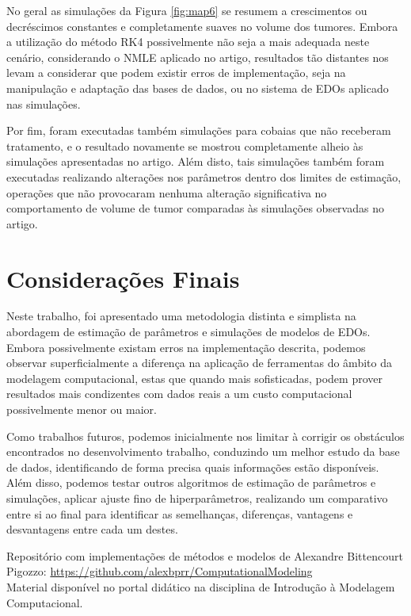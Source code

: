 \documentclass[12pt]{article}
\begin{document}
No geral as simulações da Figura \ref{fig:map6} se resumem a crescimentos ou decréscimos constantes e completamente suaves no volume dos tumores. Embora a utilização do método RK4 possivelmente não seja a mais adequada neste cenário, considerando o NMLE aplicado no artigo, resultados tão distantes nos levam a considerar que podem existir erros de implementação, seja na manipulação e adaptação das bases de dados, ou no sistema de EDOs aplicado nas simulações.

Por fim, foram executadas também simulações para cobaias que não receberam tratamento, e o resultado novamente se mostrou completamente alheio às simulações apresentadas no artigo. Além disto, tais simulações também foram executadas realizando alterações nos parâmetros dentro dos limites de estimação, operações que não provocaram nenhuma alteração significativa no comportamento de volume de tumor comparadas às simulações observadas no artigo. 

\section{Considerações Finais} \label{sec:5}

Neste trabalho, foi apresentado uma metodologia distinta e simplista na abordagem de estimação de parâmetros e simulações de modelos de EDOs. Embora possivelmente existam erros na implementação descrita, podemos observar superficialmente a diferença na aplicação de ferramentas do âmbito da modelagem computacional, estas que quando mais sofisticadas, podem prover resultados mais condizentes com dados reais a um custo computacional possivelmente menor ou maior.

Como trabalhos futuros, podemos inicialmente nos limitar à corrigir os obstáculos encontrados no desenvolvimento trabalho, conduzindo um melhor estudo da base de dados, identificando de forma precisa quais informações estão disponíveis. Além disso, podemos testar outros algoritmos de estimação de parâmetros e simulações, aplicar ajuste fino de hiperparâmetros, realizando um comparativo entre si ao final para identificar as semelhanças, diferenças, vantagens e desvantagens entre cada um destes.

\footnotesize


\noindent Repositório com implementações de métodos e modelos de Alexandre Bittencourt Pigozzo: \url{https://github.com/alexbprr/ComputationalModeling}\\

\noindent Material disponível no portal didático na disciplina de Introdução à Modelagem Computacional.
\end{document}
